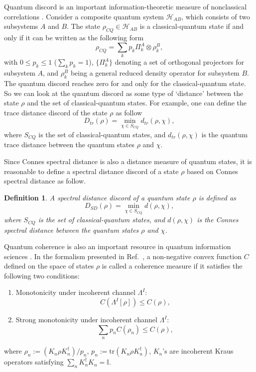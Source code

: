 \documentclass[a4paper,12pt]{article}
\newtheorem{definition}{Definition}
\begin{document}
Quantum discord is an important information-theoretic measure
of nonclassical correlations \cite{Paula,Ciccarello}.
Consider a composite quantum system $\mathcal{H}_{AB}$, which consists of two subsystems $A$ and $B$. 
The state $\rho_{CQ}\in\mathcal{H}_{AB}$ is a classical-quantum state if and only if it can be written as the following form \cite{Paula}
\begin{equation}
	\rho_{CQ} = \sum_{k} p_k \Pi_k^A \otimes \rho_k^B,
\end{equation}
with $0 \leq p_k \leq 1$ ($\sum_k p_k = 1$), $\{\Pi_k^A\}$ denoting a set of orthogonal projectors for subsystem $A$, and $\rho_k^B$ being a general reduced density operator for subsystem $B$.
The quantum discord reaches zero for and only for the classical-quantum
state. So we can look at the quantum discord as some type of `distance' between the state $\rho$ and the set of classical-quantum states.
For example, one can define the trace distance discord of the state $\rho$ as follow \cite{Ciccarello}
\begin{equation}
	D_{tr}(\rho)=\min_{\chi\in S_{CQ}}d_{tr}(\rho,\chi),
\end{equation}
where $S_{CQ}$ is the set of classical-quantum states, and $d_{tr}(\rho,\chi)$ is the quantum trace distance between the quantum states $\rho$ and $\chi$. 

Since Connes spectral distance is also a distance measure of quantum states, it is reasonable to define a spectral distance discord of a state $\rho$ based on Connes spectral distance as follow.
\begin{definition}
	A spectral distance discord of a quantum state $\rho$ is defined as
	\begin{equation}
		D_{SD}(\rho)=\min_{\chi\in S_{CQ}}d(\rho,\chi),
	\end{equation}
	where $S_{CQ}$ is the set of classical-quantum states, and $d(\rho,\chi)$ is the Connes spectral distance between the quantum states $\rho$ and $\chi$. 
\end{definition}

Quantum coherence is also an important resource in quantum information sciences \cite{Baumgratz}.
In the formalism presented
in Ref.~\cite{Baumgratz}, a non-negative convex
function $C$ defined on the  space of states $\rho$ is called a coherence measure if it
satisfies the following two conditions:
\begin{enumerate}
	\item Monotonicity under incoherent channel $\Lambda^I$: \[C(\Lambda^I[\rho])\leq C(\rho),\]
	\item Strong monotonicity under incoherent channel $\Lambda^I$:
	\begin{equation}
		\sum_np_nC(\rho_n)\leq C(\rho),
	\end{equation}
\end{enumerate}
where $\rho_n:=(K_n\rho K_n^\dagger)/p_n$, $p_n:=\mathrm{tr}(K_n\rho K_n^\dagger)$, $K_n$'s are incoherent  Kraus operators satisfying $\sum_nK_n^\dagger K_n=\mathbb{I}$.
\end{document}
